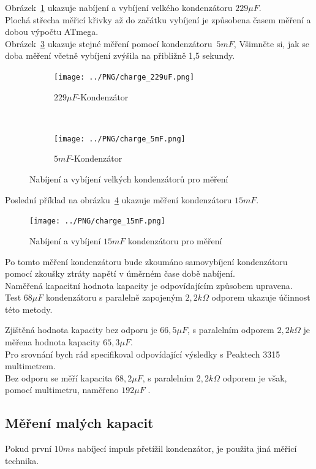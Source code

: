 Obrázek~\ref{pic:c229} ukazuje nabíjení a vybíjení velkého kondenzátoru \(229\mu F\).\\
Plochá střecha měřicí křivky až do začátku vybíjení je způsobena časem měření a dobou výpočtu ATmega.\\
Obrázek~\ref{pic:c5mF} ukazuje stejné měření pomocí kondenzátoru~\(5mF\),
Všimněte si, jak se doba měření včetně vybíjení zvýšila na přibližně 1,5 sekundy.\\
\begin{figure}[H]
  \begin{subfigure}[b]{9cm}
    \centering
    \texttt{[image: ../PNG/charge\_229uF.png]}
    \caption{\(229\mu F\)-Kondenzátor}
    \label{pic:c229}
  \end{subfigure}
  ~
  \begin{subfigure}[b]{9cm}
    \centering
    \texttt{[image: ../PNG/charge\_5mF.png]}
    \caption{\(5mF\)-Kondenzátor}
    \label{pic:c5mF}
  \end{subfigure}
  \caption{Nabíjení a vybíjení velkých kondenzátorů pro měření}
\end{figure}
Poslední příklad na obrázku~\ref{pic:c15mF} ukazuje měření kondenzátoru \(15mF\).
\begin{figure}[H]
  \centering
    \texttt{[image: ../PNG/charge\_15mF.png]}
  \caption{Nabíjení a vybíjení \(15mF\) kondenzátoru pro měření}
  \label{pic:c15mF}
\end{figure}

Po tomto měření kondenzátoru bude zkoumáno samovybíjení kondenzátoru pomocí
zkoušky ztráty napětí v úměrném čase době nabíjení.\\
Naměřená kapacitní hodnota kapacity je odpovídajícím způsobem upravena.\\ Test \(68\mu F\) kondenzátoru s paralelně zapojeným \(2,2k\Omega\) odporem ukazuje účinnost této metody.

Zjištěná hodnota kapacity bez odporu
je \(66,5\mu F\), s paralelním odporem \(2,2k\Omega\) je měřena hodnota kapacity \(65,3\mu F\).\\
Pro srovnání bych rád specifikoval odpovídající výsledky s Peaktech 3315 multimetrem.\\
Bez odporu se měří kapacita \(68,2\mu F\), s paralelním \(2,2k\Omega\) odporem je však, pomocí multimetru, naměřeno \(192\mu F\)  .

\subsection{Měření malých kapacit}
Pokud první \(10ms\) nabíjecí impuls přetížil kondenzátor, je použita jiná měřicí technika.

